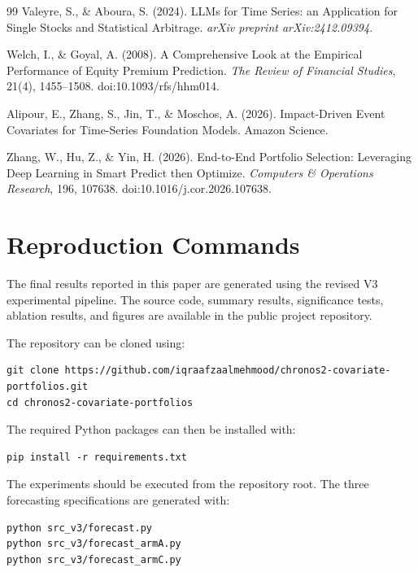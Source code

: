 \documentclass[12pt,a4paper,twoside,openany]{book}
\begin{document}
\begin{thebibliography}{99}
Valeyre, S., \& Aboura, S. (2024).
LLMs for Time Series: an Application for Single Stocks and
Statistical Arbitrage.
\textit{arXiv preprint arXiv:2412.09394}.

Welch, I., \& Goyal, A. (2008).
A Comprehensive Look at the Empirical Performance of Equity
Premium Prediction.
\textit{The Review of Financial Studies}, 21(4), 1455--1508.
doi:10.1093/rfs/hhm014.

Alipour, E., Zhang, S., Jin, T., \& Moschos, A. (2026).
Impact-Driven Event Covariates for Time-Series Foundation Models.
Amazon Science.

Zhang, W., Hu, Z., \& Yin, H. (2026).
End-to-End Portfolio Selection: Leveraging Deep Learning in
Smart Predict then Optimize.
\textit{Computers \& Operations Research}, 196, 107638.
doi:10.1016/j.cor.2026.107638.

\end{thebibliography}
\appendix

\chapter{Reproduction Commands}
\label{appendix-reproduction}

The final results reported in this paper are generated using the revised
V3 experimental pipeline. The source code, summary results, significance
tests, ablation results, and figures are available in the public project
repository.

The repository can be cloned using:

\begin{verbatim}
git clone https://github.com/iqraafzaalmehmood/chronos2-covariate-portfolios.git
cd chronos2-covariate-portfolios
\end{verbatim}

The required Python packages can then be installed with:

\begin{verbatim}
pip install -r requirements.txt
\end{verbatim}

The experiments should be executed from the repository root. The three
forecasting specifications are generated with:

\begin{verbatim}
python src_v3/forecast.py
python src_v3/forecast_armA.py
python src_v3/forecast_armC.py
\end{verbatim}
\end{document}
